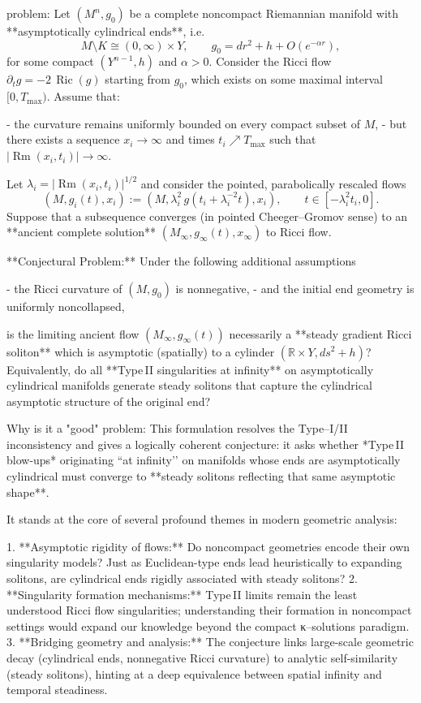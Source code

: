 problem:  
Let \((M^n,g_0)\) be a complete noncompact Riemannian manifold with **asymptotically cylindrical ends**, i.e.
\[
M\setminus K \cong (0,\infty)\times Y,
\qquad
g_0 = dr^2 + h + O(e^{-\alpha r}),
\]
for some compact \((Y^{n-1},h)\) and \(\alpha>0\).  
Consider the Ricci flow \(\partial_t g = -2\,\operatorname{Ric}(g)\) starting from \(g_0\), which exists on some maximal interval \([0,T_{\max})\).  
Assume that:

- the curvature remains uniformly bounded on every compact subset of \(M\),
- but there exists a sequence \(x_i\to\infty\) and times \(t_i\nearrow T_{\max}\) such that \(|\operatorname{Rm}(x_i,t_i)|\to\infty\).

Let \(\lambda_i = |\operatorname{Rm}(x_i,t_i)|^{1/2}\) and consider the pointed, parabolically rescaled flows
\[
(M,g_i(t),x_i) := (M,\lambda_i^2\,g(t_i+\lambda_i^{-2} t),x_i),
\qquad t\in[-\lambda_i^2 t_i,0].
\]
Suppose that a subsequence converges (in pointed Cheeger–Gromov sense) to an **ancient complete solution** \((M_\infty,g_\infty(t),x_\infty)\) to Ricci flow.

**Conjectural Problem:**  
Under the following additional assumptions

- the Ricci curvature of \((M,g_0)\) is nonnegative,  
- and the initial end geometry is uniformly noncollapsed,

is the limiting ancient flow \((M_\infty,g_\infty(t))\) necessarily a **steady gradient Ricci soliton** which is asymptotic (spatially) to a cylinder \((\mathbb{R}\times Y,ds^2+h)\)?  
Equivalently, do all **Type II singularities at infinity** on asymptotically cylindrical manifolds generate steady solitons that capture the cylindrical asymptotic structure of the original end?

Why is it a "good" problem:  
This formulation resolves the Type–I/II inconsistency and gives a logically coherent conjecture: it asks whether *Type II blow-ups* originating “at infinity’’ on manifolds whose ends are asymptotically cylindrical must converge to **steady solitons reflecting that same asymptotic shape**.  

It stands at the core of several profound themes in modern geometric analysis:

1. **Asymptotic rigidity of flows:** Do noncompact geometries encode their own singularity models? Just as Euclidean-type ends lead heuristically to expanding solitons, are cylindrical ends rigidly associated with steady solitons?  
2. **Singularity formation mechanisms:** Type II limits remain the least understood Ricci flow singularities; understanding their formation in noncompact settings would expand our knowledge beyond the compact κ–solutions paradigm.  
3. **Bridging geometry and analysis:** The conjecture links large-scale geometric decay (cylindrical ends, nonnegative Ricci curvature) to analytic self-similarity (steady solitons), hinting at a deep equivalence between spatial infinity and temporal steadiness.

